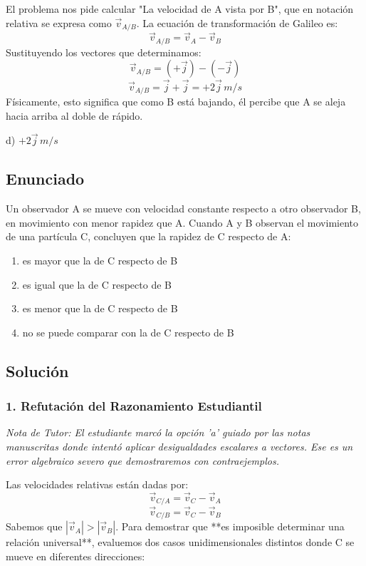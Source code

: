 \documentclass[12pt, a4paper]{article}
\begin{document}
El problema nos pide calcular "La velocidad de A vista por B", que en notación relativa se expresa como $\vec{v}_{A/B}$. La ecuación de transformación de Galileo es:
$$ \vec{v}_{A/B} = \vec{v}_A - \vec{v}_B $$
Sustituyendo los vectores que determinamos:
$$ \vec{v}_{A/B} = (+\vec{j}) - (-\vec{j}) $$
$$ \vec{v}_{A/B} = \vec{j} + \vec{j} = +2\vec{j} \,\si{m/s} $$
Físicamente, esto significa que como B está bajando, él percibe que A se aleja hacia arriba al doble de rápido.

\begin{tcolorbox}[colback=green!5!white, colframe=green!50!black, title=Respuesta Final]
\centering \Large d) $+2\vec{j} \,\si{m/s}$
\end{tcolorbox}

\newpage

\subsection*{Enunciado}
Un observador A se mueve con velocidad constante respecto a otro observador B, en movimiento con menor rapidez que A. Cuando A y B observan el movimiento de una partícula C, concluyen que la rapidez de C respecto de A:
\begin{enumerate}[label=\alph*)]
    \item es mayor que la de C respecto de B
    \item es igual que la de C respecto de B
    \item es menor que la de C respecto de B
    \item no se puede comparar con la de C respecto de B
\end{enumerate}

\subsection*{Solución}

\subsubsection*{1. Refutación del Razonamiento Estudiantil}
\textit{Nota de Tutor: El estudiante marcó la opción 'a' guiado por las notas manuscritas donde intentó aplicar desigualdades escalares a vectores. Ese es un error algebraico severo que demostraremos con contraejemplos.}

Las velocidades relativas están dadas por:
$$ \vec{v}_{C/A} = \vec{v}_C - \vec{v}_A $$
$$ \vec{v}_{C/B} = \vec{v}_C - \vec{v}_B $$
Sabemos que $|\vec{v}_A| > |\vec{v}_B|$. Para demostrar que **es imposible determinar una relación universal**, evaluemos dos casos unidimensionales distintos donde C se mueve en diferentes direcciones:
\end{document}
